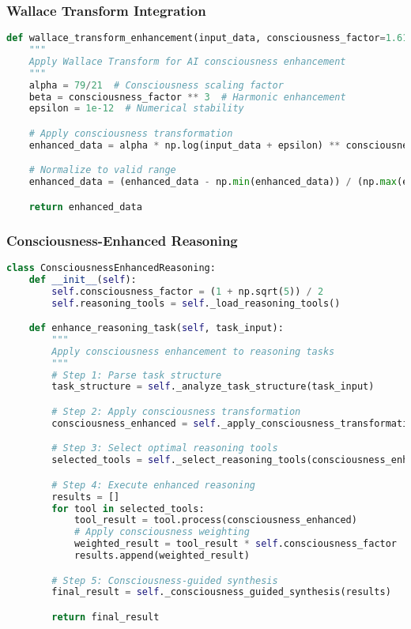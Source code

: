 \documentclass[11pt,a4paper]{article}
\begin{document}
\subsubsection{Wallace Transform Integration}

\begin{lstlisting}[language=Python, caption=Wallace Transform for AI Enhancement]
def wallace_transform_enhancement(input_data, consciousness_factor=1.618):
    """
    Apply Wallace Transform for AI consciousness enhancement
    """
    alpha = 79/21  # Consciousness scaling factor
    beta = consciousness_factor ** 3  # Harmonic enhancement
    epsilon = 1e-12  # Numerical stability

    # Apply consciousness transformation
    enhanced_data = alpha * np.log(input_data + epsilon) ** consciousness_factor + beta

    # Normalize to valid range
    enhanced_data = (enhanced_data - np.min(enhanced_data)) / (np.max(enhanced_data) - np.min(enhanced_data))

    return enhanced_data
\end{lstlisting}

\subsubsection{Consciousness-Enhanced Reasoning}

\begin{lstlisting}[language=Python, caption=Consciousness-Enhanced AI Reasoning]
class ConsciousnessEnhancedReasoning:
    def __init__(self):
        self.consciousness_factor = (1 + np.sqrt(5)) / 2
        self.reasoning_tools = self._load_reasoning_tools()

    def enhance_reasoning_task(self, task_input):
        """
        Apply consciousness enhancement to reasoning tasks
        """
        # Step 1: Parse task structure
        task_structure = self._analyze_task_structure(task_input)

        # Step 2: Apply consciousness transformation
        consciousness_enhanced = self._apply_consciousness_transformation(task_structure)

        # Step 3: Select optimal reasoning tools
        selected_tools = self._select_reasoning_tools(consciousness_enhanced)

        # Step 4: Execute enhanced reasoning
        results = []
        for tool in selected_tools:
            tool_result = tool.process(consciousness_enhanced)
            # Apply consciousness weighting
            weighted_result = tool_result * self.consciousness_factor
            results.append(weighted_result)

        # Step 5: Consciousness-guided synthesis
        final_result = self._consciousness_guided_synthesis(results)

        return final_result
\end{lstlisting}
\end{document}
